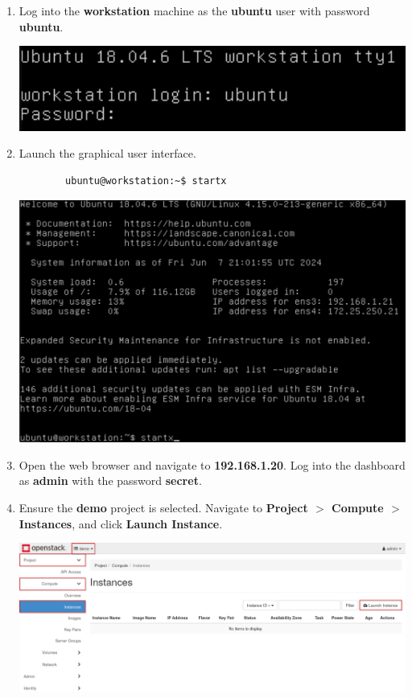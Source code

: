 \documentclass[letterpaper, 12pt]{article}
\begin{document}
\begin{enumerate}
    \item Log into the \textbf{workstation} machine as the \textbf{ubuntu} user with password \textbf{ubuntu}.

    \begin{center}
        \includegraphics[width=\linewidth]{images/part1/step1.png}
    \end{center}

    \item Launch the graphical user interface.
    \begin{lstlisting}
        ubuntu@workstation:~$ startx
    \end{lstlisting}

    \begin{center}
        \includegraphics[width=\linewidth]{images/part1/step2.png}
    \end{center}

    \item Open the web browser and navigate to \textbf{192.168.1.20}.
    Log into the dashboard as \textbf{admin} with the password \textbf{secret}.

    \item Ensure the \textbf{demo} project is selected.
    Navigate to \textbf{Project $>$ Compute $>$ Instances}, and click \textbf{Launch Instance}.

    \begin{center}
        \includegraphics[width=\linewidth]{images/part1/step4.png}
    \end{center}


\end{enumerate}
\end{document}
